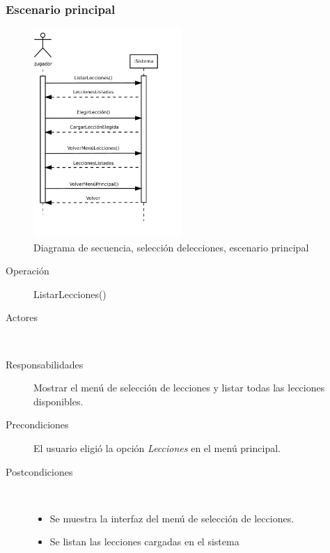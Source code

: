 \subsubsection{Escenario principal}
\begin{figure}[h!]
  \centering
  \includegraphics[trim=0cm 4cm 0cm 0cm, clip=true, width=0.5\textwidth]{4_analisis/diagsec_caso7_esc1}
  \caption{Diagrama de secuencia, selección delecciones, escenario principal}
\end{figure}


\begin{description}
\item[Operación] ListarLecciones()
\item[Actores] \jugador\, \sistema\
\item[Responsabilidades] Mostrar el menú de selección de lecciones y listar
  todas las lecciones disponibles.
\item[Precondiciones] El usuario eligió la opción \textit{Lecciones} en el menú
  principal.
\item[Postcondiciones] $\quad$
  \begin{itemize}
  \item Se muestra la interfaz del menú de selección de lecciones.
  \item Se listan las lecciones cargadas en el sistema
  \end{itemize}
\end{description}

